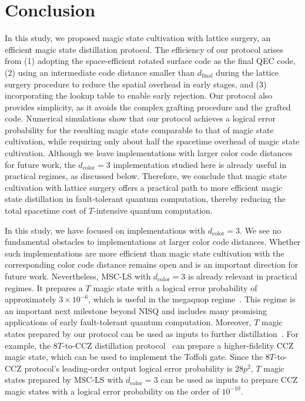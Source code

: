 \section{Conclusion}
\label{sec:conclusion}

In this study, we proposed magic state cultivation with lattice surgery, an efficient magic state distillation protocol.
The efficiency of our protocol arises from (1) adopting the space-efficient rotated surface code as the final QEC code, (2) using an intermediate code distance smaller than $d_\mathrm{final}$ during the lattice surgery procedure to reduce the spatial overhead in early stages, and (3) incorporating the lookup table to enable early rejection.
Our protocol also provides simplicity, as it avoids the complex grafting procedure and the grafted code.
Numerical simulations show that our protocol achieves a logical error probability for the resulting magic state comparable to that of magic state cultivation, while requiring only about half the spacetime overhead of magic state cultivation.
Although we leave implementations with larger color code distances for future work, the $d_\mathrm{color} = 3$ implementation studied here is already useful in practical regimes, as discussed below.
Therefore, we conclude that magic state cultivation with lattice surgery offers a practical path to more efficient magic state distillation in fault-tolerant quantum computation, thereby reducing the total spacetime cost of $T$-intensive quantum computation.

In this study, we have focused on implementations with $d_\mathrm{color} = 3$.
We see no fundamental obstacles to implementations at larger color code distances.
Whether such implementations are more efficient than magic state cultivation with the corresponding color code distance remains open and is an important direction for future work.
Nevertheless, MSC-LS with $d_\mathrm{color} = 3$ is already relevant in practical regimes.
It prepares a $T$ magic state with a logical error probability of approximately $3 \times 10^{-6}$, which is useful in the megaquop regime~\cite{preskill2025beyond}.
This regime is an important next milestone beyond NISQ and includes many promising applications of early fault-tolerant quantum computation.
Moreover, $T$ magic states prepared by our protocol can be used as inputs to further distillation~\cite{Litinski2019magicstate}.
For example, the $8T$-to-$\mathrm{CCZ}$ distillation protocol~\cite{Campbell2017Unified} can prepare a higher-fidelity $\mathrm{CCZ}$ magic state, which can be used to implement the Toffoli gate.
Since the $8T$-to-$\mathrm{CCZ}$ protocol's leading-order output logical error probability is $28p^2$, $T$ magic states prepared by MSC-LS with $d_\mathrm{color} = 3$ can be used as inputs to prepare $\mathrm{CCZ}$ magic states with a logical error probability on the order of $10^{-10}$.

